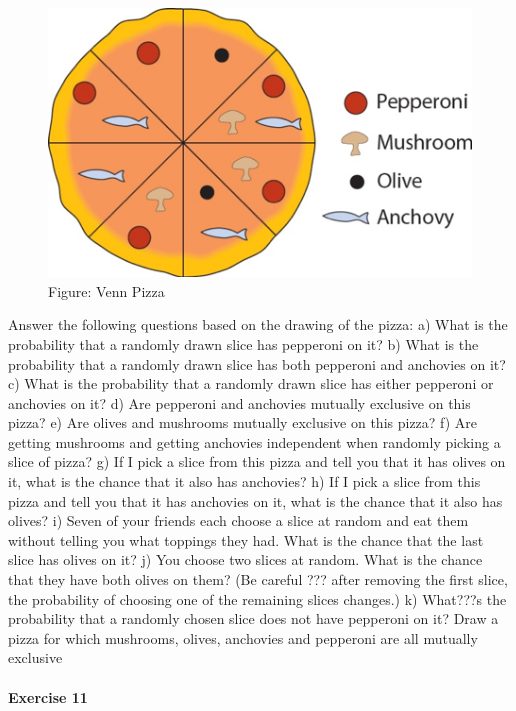 \documentclass[]{article}
\let\oldparagraph\paragraph
\renewcommand{\paragraph}[1]{\oldparagraph{#1}\mbox{}}
\begin{document}
\begin{figure}
\centering
\includegraphics{Pizza.png}
\caption{Figure: Venn Pizza}
\end{figure}

Answer the following questions based on the drawing of the pizza: a)
What is the probability that a randomly drawn slice has pepperoni on it?
b) What is the probability that a randomly drawn slice has both
pepperoni and anchovies on it? c) What is the probability that a
randomly drawn slice has either pepperoni or anchovies on it? d) Are
pepperoni and anchovies mutually exclusive on this pizza? e) Are olives
and mushrooms mutually exclusive on this pizza? f) Are getting mushrooms
and getting anchovies independent when randomly picking a slice of
pizza? g) If I pick a slice from this pizza and tell you that it has
olives on it, what is the chance that it also has anchovies? h) If I
pick a slice from this pizza and tell you that it has anchovies on it,
what is the chance that it also has olives? i) Seven of your friends
each choose a slice at random and eat them without telling you what
toppings they had. What is the chance that the last slice has olives on
it? j) You choose two slices at random. What is the chance that they
have both olives on them? (Be careful ??? after removing the first
slice, the probability of choosing one of the remaining slices changes.)
k) What???s the probability that a randomly chosen slice does not have
pepperoni on it? Draw a pizza for which mushrooms, olives, anchovies and
pepperoni are all mutually exclusive

\hypertarget{exercise-11}{%
\paragraph{Exercise 11}\label{exercise-11}}
\end{document}
